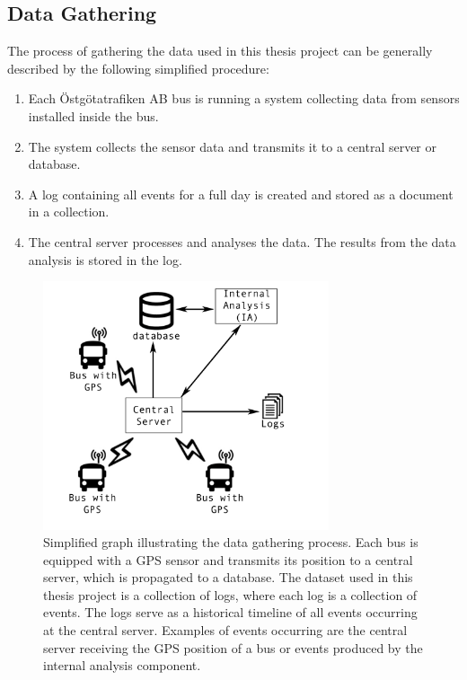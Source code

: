 \subsection{Data Gathering}
The process of gathering the data used in this thesis project can be generally described by the following simplified procedure:
\begin{enumerate}
    \item Each Östgötatrafiken AB bus is running a system collecting data from sensors installed inside the bus.
    \item The system collects the sensor data and transmits it to a central server or database.
    \item A log containing all events for a full day is created and stored as a document in a collection.
    \item The central server processes and analyses the data.
    The results from the data analysis is stored in the log.
\end{enumerate}

\begin{figure}
    \centering
    \includegraphics[width=0.75\textwidth]{figures/data-gathering}
    \caption[Simplified graph illustrating the data gathering process]
    {\small Simplified graph illustrating the data gathering process. 
    Each bus is equipped with a GPS sensor and transmits its position to a central server, which is propagated to a database.
    The dataset used in this thesis project is a collection of logs, where each log is a collection of events.
    The logs serve as a historical timeline of all events occurring at the central server.
    Examples of events occurring are the central server receiving the GPS position of a bus or events produced by the internal analysis component.}
    \label{fig:data-gathering}
\end{figure}

